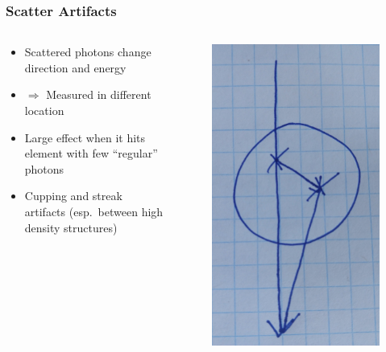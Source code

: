 \begin{frame}
	\frametitle{Scatter Artifacts}
	\begin{columns}[c, onlytextwidth]
		\begin{column}{0.75\textwidth}
		\begin{itemize}
			\item Scattered photons change direction and energy
			\item[ ] $\Rightarrow$ Measured in different location
			\item Large effect when it hits element with few ``regular'' photons

			\item Cupping and streak artifacts (esp.\ between high density structures)
		
		\end{itemize}
		\end{column}
		\begin{column}{0.25\textwidth}
		 \begin{figure}
			\centering
			\includegraphics[height=0.75\textwidth]{images/scatter_sketch}
		 \end{figure}
	\end{column}
	\end{columns}

\end{frame}
	
